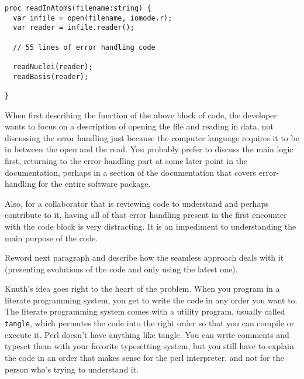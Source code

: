 \begin{verbatim}
proc readInAtoms(filename:string) {
  var infile = open(filename, iomode.r);
  var reader = infile.reader();

  // 55 lines of error handling code

  readNuclei(reader);
  readBasis(reader);

}
\end{verbatim}

When first describing the function of the above block of code, the developer wants to focus on a description of 
opening the file 
and reading in data, not discussing the error handling just because the computer language requires it to be in 
between the open and the read. You probably prefer to discuss the main logic first, returning to the error-handling 
part at some later point in the documentation, perhaps in a section of the documentation that covers error-handling
for the entire software package.

Also, for a collaborator that is reviewing code to understand and perhaps contribute to it, having all of that
error handling present in the first encounter with the code block is very distracting. It is an impediment to 
understanding the main purpose of the code.

\begin{TODO}
Reword next paragraph and describe how the seamless approach deals with it (presenting evolutions of the
code and only using the latest one).
\end{TODO}
Knuth's idea goes right to the heart of the problem. When you program in a literate programming system, you 
get to write the code in any order you want to. The literate programming system comes with a utility program, 
usually called 
\lstinline{tangle}, which permutes the code into the right order so that you can compile or execute it.
Perl doesn't have anything like tangle. You can write comments and typeset them with your favorite typesetting 
system, but you still have to explain the code in an order that makes sense for the perl interpreter, and 
not for the person who's trying to understand it.
